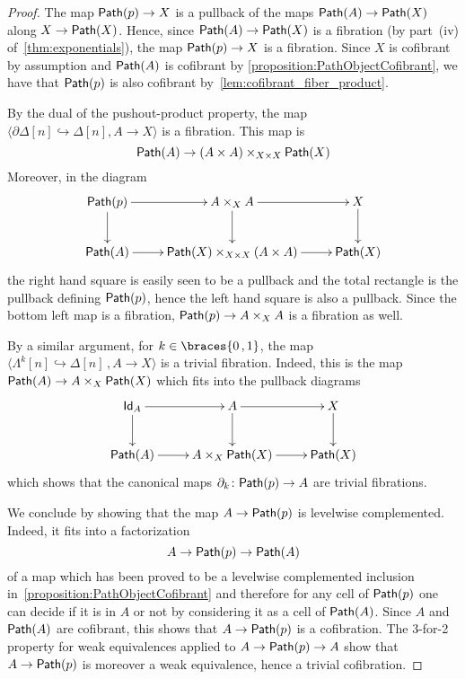 \documentclass[reqno,10pt,a4paper,oneside,draft]{amsart}
\begin{document}
\begin{proof} The map $\mathsf{Path}(p) \rightarrow X$ is a pullback of the maps $\mathsf{Path}(A) \rightarrow \mathsf{Path}(X)$ along $X \rightarrow \mathsf{Path}(X)$. Hence, since $\mathsf{Path}(A) \rightarrow \mathsf{Path}(X)$ is a fibration (by part~(iv) of~\cref{thm:exponentials}), the map $\mathsf{Path}(p) \rightarrow X$ is a fibration. Since $X$ is cofibrant by assumption and $\mathsf{Path}(A)$ is  cofibrant by \cref{proposition:PathObjectCofibrant}, we have that $\mathsf{Path}(p)$ is also cofibrant by~\cref{lem:cofibrant_fiber_product}. 

By the dual of the pushout-product property, the map $\langle \partial \Delta[n] \hookrightarrow \Delta[n] ,  A \rightarrow X \rangle$ is a fibration. This map is 
\[ 
\mathsf{Path}(A) \rightarrow (A \times A) \times_{X \times X} \mathsf{Path}(X)
\] 
Moreover, in the diagram
\[
\xymatrix{
\Path(p) \ar[r] \ar[d] & A \times_{X} A \ar[d] \ar[r] & X \ar[d] \\
\Path(A) \ar[r] & \Path(X) \times_{X \times X}  (A \times A) \ar[r]  & \Path(X)
}
 \]
the right hand square is easily seen to be a pullback and the total rectangle is the pullback defining $\mathsf{Path}(p)$, hence the left hand square is also a pullback. Since the bottom left map is a fibration,  $\mathsf{Path}(p) \rightarrow A \times_{X} A$ is a fibration as well.

By a similar argument, for $k \in \braces{ 0 \, , 1}$, the map $\langle \Lambda^k[n] \hookrightarrow \Delta[n] \, , A \rightarrow X\rangle$ is a trivial fibration. Indeed, this is the map $\mathsf{Path}(A) \rightarrow  A  \times_X \mathsf{Path}(X)$ which fits into the pullback diagrams
\[
\xymatrix{
\Id_A \ar[r] \ar[d] & A  \ar[d] \ar[r] & X \ar[d] \\
\Path(A) \ar[r] & A \times_X \Path(X) \ar[r]  & \Path(X)
}
 \]
which  shows that the canonical maps $\partial_k \colon \mathsf{Path}(p) \rightarrow A$ are trivial fibrations.

We conclude by showing that the map $A \rightarrow \mathsf{Path}(p)$ is levelwise complemented. Indeed, it fits into a factorization 
\[
A \rightarrow \mathsf{Path}(p) \rightarrow \mathsf{Path}(A)
\] 
of a map which has been proved to be a levelwise complemented inclusion in~\cref{proposition:PathObjectCofibrant} and therefore for any cell of $\mathsf{Path}(p)$ one can decide if it is in $A$ or not by considering it as a cell of $\mathsf{Path}(A)$. Since $A$ and $\mathsf{Path}(A)$ are cofibrant, this shows that $A \rightarrow \mathsf{Path}(p)$ is a cofibration. The 3-for-2 property for weak equivalences applied to $A \rightarrow \mathsf{Path}(p) \rightarrow A$ show that  $A \rightarrow \mathsf{Path}(p)$ is moreover a weak equivalence, hence a trivial cofibration.
\end{proof}
\end{document}
